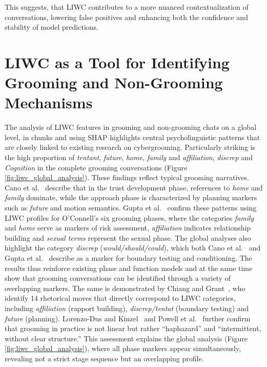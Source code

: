 This suggests, that LIWC contributes to a more nuanced contextualization of conversations, lowering false positives and enhancing both the confidence and stability of model predictions.



\section{LIWC as a Tool for Identifying Grooming and Non-Grooming Mechanisms}

The analysis of LIWC features in grooming and non-grooming chats on a global level, in chunks and using SHAP highlights central psycholinguistic patterns that are closely linked to existing research on cybergrooming. Particularly striking is the high proportion of \textit{tentant}, \textit{future}, \textit{home}, \textit{family} and \textit{affiliation}, \textit{discrep} and \textit{Cognition} in the complete grooming conversations (Figure \ref{fig:liwc_global_analysis}). These findings reflect typical grooming narratives. Cano et al.~\cite{Cano2014} describe that in the trust development phase, references to \textit{home} and \textit{family} dominate, while the approach phase is characterized by planning markers such as \textit{future} and motion semantics. Gupta et al.~\cite{gupta2012characterizingpedophileconversationsinternet} confirm these patterns using LIWC profiles for O’Connell’s six grooming phases, where the categories \textit{family} and \textit{home} serve as markers of risk assessment, \textit{affiliation} indicates relationship building and \textit{sexual terms} represent the sexual phase. The global analyses also highlight the category \textit{discrep} (\textit{would/should/could}), which both Cano et al.~\cite{Cano2014} and Gupta et al.~\cite{gupta2012characterizingpedophileconversationsinternet} describe as a marker for boundary testing and conditioning. The results thus reinforce existing phase and function models and at the same time show that grooming conversations can be identified through a variety of overlapping markers. The same is demonstrated by Chiang and Grant~\cite{chiangandgrant2017online}, who identify 14 rhetorical moves that directly correspond to LIWC categories, including \textit{affiliation} (rapport building), \textit{discrep/tentat} (boundary testing) and \textit{future} (planning).  Lorenzo-Dus and Kinzel~\cite{LorenzoDus2019} and Powell et al.~\cite{powell2021online} further confirm that grooming in practice is not linear but rather “haphazard” and “intermittent, without clear structure.” This assessment explains the global analysis (Figure \ref{fig:liwc_global_analysis}), where all phase markers appear simultaneously, revealing not a strict stage sequence but an overlapping profile.

